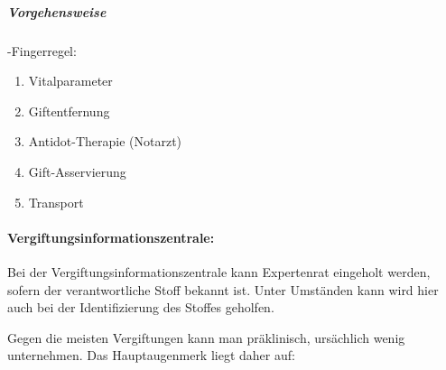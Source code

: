 \subparagraph*{Vorgehensweise}

{-Fingerregel:}

\begin{enumerate}
  \item Vitalparameter
  \item Giftentfernung
  \item Antidot-Therapie (Notarzt)
  \item Gift-Asservierung
  \item Transport
\end{enumerate}

\paragraph{Vergiftungsinformationszentrale:}


Bei der Vergiftungsinformationszentrale kann Expertenrat
eingeholt werden, sofern der verantwortliche Stoff bekannt
ist. Unter Umständen kann wird hier auch bei der
Identifizierung des Stoffes geholfen.


Gegen die meisten Vergiftungen kann man präklinisch,
ursächlich wenig unternehmen. Das Hauptaugenmerk liegt
daher auf: 

